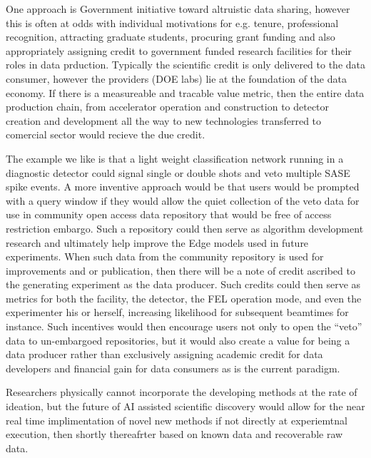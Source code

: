 \documentclass{article}
\begin{document}
One approach is Government initiative toward altruistic data sharing, however this is often at odds with individual motivations for e.g. tenure, professional recognition, attracting graduate students, procuring grant funding and also appropriately assigning credit to government funded research facilities for their roles in data prduction.  Typically the scientific credit is only delivered to the data consumer, however the providers (DOE labs) lie at the foundation of the data economy.
If there is a measureable and tracable value metric, then the entire data production chain, from accelerator operation and construction to detector creation and development all the way to new technologies transferred to comercial sector would recieve the due credit.

The example we like is that a light weight classification network running in a diagnostic detector could signal single or double shots and veto multiple SASE spike events.
A more inventive approach would be that users would be prompted with a query window if they would allow the quiet collection of the veto data for use in community open access data repository that would be free of access restriction embargo.
Such a repository could then serve as algorithm development research and ultimately help improve the Edge models used in future experiments.
When such data from the community repository is used for improvements and or publication, then there will be a note of credit ascribed to the generating experiment as the data producer.
Such credits could then serve as metrics for both the facility, the detector, the FEL operation mode, and even the experimenter his or herself, increasing likelihood for subsequent beamtimes for instance.
Such incentives would then encourage users not only to open the ``veto'' data to un-embargoed repositories, but it would also create a value for being a data producer rather than exclusively assigning academic credit for data developers and financial gain for data consumers as is the current paradigm.

Researchers physically cannot incorporate the developing methods at the rate of ideation, but the future of AI assisted scientific discovery would allow for the near real time implimentation of novel new methods if not directly at experiemtnal execution, then shortly thereafrter based on known data and recoverable raw data.
\end{document}
